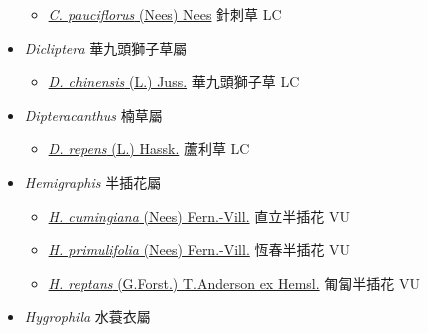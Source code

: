 \begin{itemize}
  \begin{itemize}
        \item[] \href{http://www.theplantlist.org/tpl1.1/search?q=Codonacanthus+pauciflorus}{\textit{C. pauciflorus} (Nees) Nees}   針刺草 LC
  \end{itemize}
 \item[] \textit{Dicliptera} 華九頭獅子草屬
                    
  \begin{itemize}
        \item[] \href{http://www.theplantlist.org/tpl1.1/search?q=Dicliptera+chinensis}{\textit{D. chinensis} (L.) Juss.}   華九頭獅子草 LC
  \end{itemize}
 \item[] \textit{Dipteracanthus} 楠草屬
                    
  \begin{itemize}
        \item[] \href{http://www.theplantlist.org/tpl1.1/search?q=Dipteracanthus+repens}{\textit{D. repens} (L.) Hassk.}   蘆利草 LC
  \end{itemize}
 \item[] \textit{Hemigraphis} 半插花屬
                    
  \begin{itemize}
        \item[] \href{http://www.theplantlist.org/tpl1.1/search?q=Hemigraphis+cumingiana}{\textit{H. cumingiana} (Nees) Fern.-Vill.}   直立半插花 VU
        \item[] \href{http://www.theplantlist.org/tpl1.1/search?q=Hemigraphis+primulifolia}{\textit{H. primulifolia} (Nees) Fern.-Vill.}   恆春半插花 VU
        \item[] \href{http://www.theplantlist.org/tpl1.1/search?q=Hemigraphis+reptans}{\textit{H. reptans} (G.Forst.) T.Anderson ex Hemsl.}   匍匐半插花 VU
  \end{itemize}
 \item[] \textit{Hygrophila} 水蓑衣屬
                    

\end{itemize}
